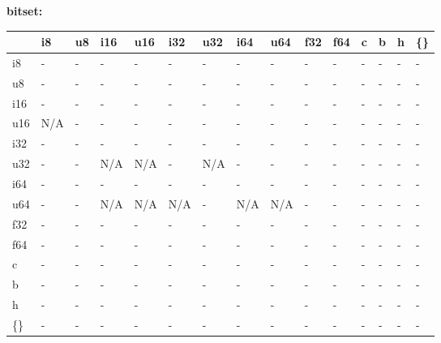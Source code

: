 \newpage
\textbf{bitset:}
\begin{scriptsize}\begin{tt}\begin{center}\vspace{-.3cm}\begin{tabular}{|m{.65cm}||m{.65cm}|m{.65cm}|m{.65cm}|m{.65cm}|m{.65cm}|m{.65cm}|m{.65cm}|m{.65cm}|m{.65cm}|m{.65cm}|m{.65cm}|m{.65cm}|m{.65cm}|m{.65cm}|}\hline 
&i8&u8&i16&u16&i32&u32&i64&u64&f32&f64&c&b&h&\{\}\\ \hline \hline
i8&-&-&-&-&-&-&-&-&-&-&-&-&-&-\\ \hline
u8&-&-&-&-&-&-&-&-&-&-&-&-&-&-\\ \hline
i16&-&-&-&-&-&-&-&-&-&-&-&-&-&-\\ \hline
u16&N/A&-&-&-&-&-&-&-&-&-&-&-&-&-\\ \hline
i32&-&-&-&-&-&-&-&-&-&-&-&-&-&-\\ \hline
u32&-&-&N/A&N/A&-&N/A&-&-&-&-&-&-&-&-\\ \hline
i64&-&-&-&-&-&-&-&-&-&-&-&-&-&-\\ \hline
u64&-&-&N/A&N/A&N/A&-&N/A&N/A&-&-&-&-&-&-\\ \hline
f32&-&-&-&-&-&-&-&-&-&-&-&-&-&-\\ \hline
f64&-&-&-&-&-&-&-&-&-&-&-&-&-&-\\ \hline
c&-&-&-&-&-&-&-&-&-&-&-&-&-&-\\ \hline
b&-&-&-&-&-&-&-&-&-&-&-&-&-&-\\ \hline
h&-&-&-&-&-&-&-&-&-&-&-&-&-&-\\ \hline
\{\}&-&-&-&-&-&-&-&-&-&-&-&-&-&-\\ \hline
\end{tabular}\end{center}\end{tt}\end{scriptsize} 

